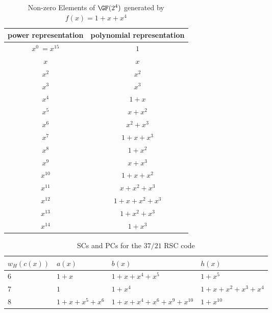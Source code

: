 \begin{table}[htbp]
		\caption{Non-zero Elements of $\GF (2^4)$ generated by $f(x)=1+x+x^4$}
		\centering
		\begin{tabular}{c c} 
			\toprule
			power representation & polynomial representation \\ [0.5ex] 
			\midrule
			$x^0~=x^{15}$ & $1$\\
			\hline
			$x$ & $x$\\
			\hline
			$x^2$ &  $x^2$\\
			\hline
			$x^3$ &  $x^3$\\
			\hline
			$x^4$ &  $1+x$\\
			\hline
			$x^5$ &  $x+x^2$\\
			\hline
			$x^6$ &  $x^2+x^3$\\
			\hline
			$x^7$ &  $1+x+x^3$\\
			\hline
			$x^8$ &  $1+x^2$\\
			\hline
			$x^9$ &  $x+x^3$\\
			\hline
			$x^{10}$ &  $1+x+x^2$\\
			\hline
			$x^{11}$ &  $x+x^2+x^3$\\
			\hline
			$x^{12}$ &  $1+x+x^2+x^3$\\
			\hline
			$x^{13}$ &  $1+x^2+x^3$\\
			\hline
			$x^{14}$ &  $1+x^3$\\
			\bottomrule
		\end{tabular}
		\label{gf-16-table}
	\end{table}
	
	
	
	\begin{table}[htbp]
		\caption{SCs and PCs for the $37/21$ RSC code}
		\centering
		\begin{tabularx}{0.75\textwidth}{Xlll} 
			\toprule
			$w_H(c(x))$&$a(x)$ & $b(x)$ & $h(x)$ \\ [0.5ex] 
			\midrule
			6&$1+x$ & $1+x+x^{4}+x^5$ & $1+x^5$\\
			\hline
			7&$1$ & $1+x^4$ & $1+x+x^2+x^3+x^4$\\
			\hline
			8&$1+x+x^5+x^6$ & $1+x+x^4+x^6+x^9+x^{10}$ & $1+x^{10}$\\
			\bottomrule
		\end{tabularx}
		
		\label{novelTab14}
	\end{table}
	
